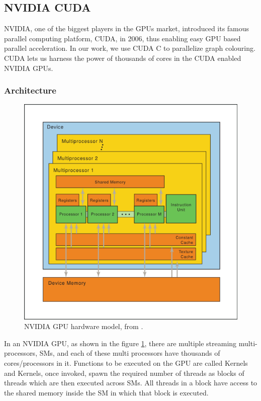 \documentclass[MTech]{iitmdiss}
\begin{document}
\subsection{NVIDIA CUDA}
NVIDIA, one of the biggest players in the GPUs market, introduced its famous parallel computing platform, CUDA, in 2006, thus enabling easy GPU based parallel acceleration. In our work, we use CUDA C to parallelize graph colouring. CUDA lets us harness the power of thousands of cores in the CUDA enabled NVIDIA GPUs.
\subsubsection{Architecture}
\begin{figure}[h]
    \centering
    \includegraphics[width=\textwidth,scale=0.4,keepaspectratio=true]{hardware-model.png}
    \caption{
        NVIDIA GPU hardware model, from \cite{nVidia:Hardware}.
    }
    \label{fig:nvidia}
\end{figure}
In an NVIDIA GPU, as shown in the figure \ref{fig:nvidia}, there are multiple streaming multi-processors, SMs, and each of these multi processors have thousands of cores/processors in it. Functions to be executed on the GPU are called Kernels and Kernels, once invoked, spawn the required number of threads as blocks of threads which are then executed across SMs. All threads in a block have access to the shared memory inside the SM in which that block is executed.
\end{document}
